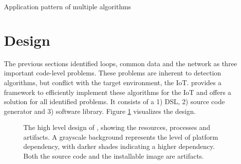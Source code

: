 \documentclass[3p,times,procedia]{elsarticle}
\begin{document}
\begin{algorithm}[b]
  \caption{Application pattern of multiple algorithms}
  \label{alg:application}
  \begin{algorithmic}
      \State {}
    \EndFor
            
      \State {}
    \EndFor
  \end{algorithmic}
\end{algorithm}

\section{Design}
\label{design}

The previous sections identified loops, common data and the network as three
important code-level problems. These problems are inherent to detection
algorithms, but conflict with the target environment, the IoT\@. \FOO provides
a framework to efficiently implement these algorithms for the IoT and offers a
solution for all identified problems. It consists of a 1) DSL, 2) source code
generator and 3) software library. Figure \ref{fig:design} visualizes the
design.

\begin{figure}[b]
  \centering
\caption{The high level design of \FOO, showing the resources, processes and
artifacts. A grayscale background represents the level of platform dependency,
with darker shades indicating a higher dependency. Both the source code and the
installable image are artifacts.}
\label{fig:design}
\end{figure}
\end{document}
